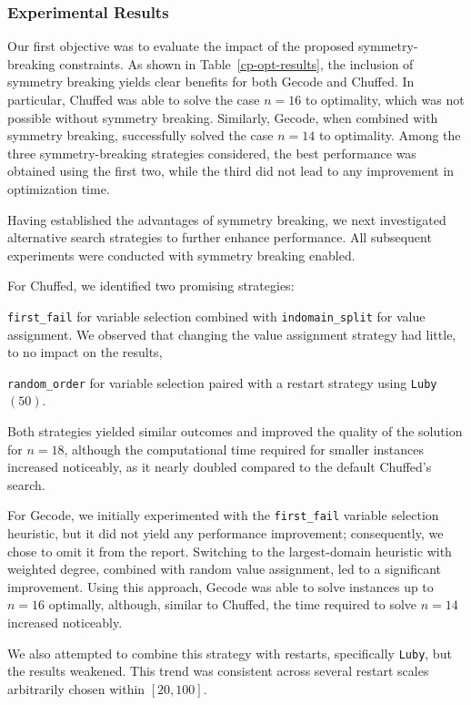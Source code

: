 \documentclass{article}
\begin{document}
\subsubsection{Experimental Results}

Our first objective was to evaluate the impact of the proposed symmetry-breaking constraints. As shown in Table~\ref{cp-opt-results}, the inclusion of symmetry breaking yields clear benefits for both Gecode and Chuffed. In particular, Chuffed was able to solve the case $n=16$ to optimality, which was not possible without symmetry breaking. Similarly, Gecode, when combined with symmetry breaking, successfully solved the case $n=14$ to optimality. Among the three symmetry-breaking strategies considered, the best performance was obtained using the first two, while the third did not lead to any improvement in optimization time.

Having established the advantages of symmetry breaking, we next investigated alternative search strategies to further enhance performance. All subsequent experiments were conducted with symmetry breaking enabled.

For Chuffed, we identified two promising strategies:
\begin{enumerate*}[label=(\roman*)]
\item \texttt{first\_fail} for variable selection combined with \texttt{indomain\_split} for value assignment. We observed that changing the value assignment strategy had little, to no impact on the results,
\item \texttt{random\_order} for variable selection paired with a restart strategy using \texttt{Luby$(50)$}.
\end{enumerate*}
Both strategies yielded similar outcomes and improved the quality of the solution for $n=18$, although the computational time required for smaller instances increased noticeably, as it nearly doubled compared to the default Chuffed's search.

For Gecode, we initially experimented with the \texttt{first\_fail} variable selection heuristic, but it did not yield any performance improvement; consequently, we chose to omit it from the report. Switching to the largest-domain heuristic with weighted degree, combined with random value assignment, led to a significant improvement. Using this approach, Gecode was able to solve instances up to $n=16$ optimally, although, similar to Chuffed, the time required to solve $n=14$ increased noticeably.

We also attempted to combine this strategy with restarts, specifically \texttt{Luby}, but the results weakened. This trend was consistent across several restart scales arbitrarily chosen within $[20,100]$.
\end{document}
